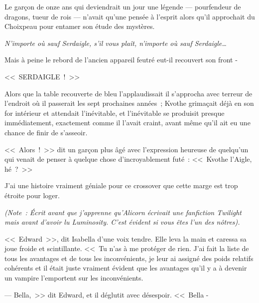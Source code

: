 
Le garçon de onze ans qui deviendrait un jour une légende — pourfendeur de dragons, tueur de rois — n'avait qu'une pensée à l'esprit alors qu'il approchait du Choixpeau pour entamer son étude des mystères.

\emph{N'importe où sauf Serdaigle, s'il vous plaît, n'importe où sauf Serdaigle…}

Mais à peine le rebord de l'ancien appareil feutré eut-il recouvert son front -

<<~SERDAIGLE~!~>>

Alors que la table recouverte de bleu l'applaudissait il s'approcha avec terreur de l'endroit où il passerait les sept prochaines années~; Kvothe grimaçait déjà en son for intérieur et attendait l'inévitable, et l'inévitable se produisit presque immédiatement, exactement comme il l'avait craint, avant même qu'il ait eu une chance de finir de s'asseoir.

<<~Alors~!~>> dit un garçon plus âgé avec l'expression heureuse de quelqu'un qui venait de penser à quelque chose d'incroyablement futé~: <<~Kvothe l'Aigle, hé~?~>> \footnotemark{}


J'ai une histoire vraiment géniale pour ce crossover que cette marge est trop étroite pour loger.


\emph{(Note~: Écrit avant que j'apprenne qu'Alicorn écrivait une fanfiction Twilight mais avant d'avoir lu {Luminosity}. C'est évident si vous êtes l'un des nôtres).}

<<~Edward~>>, dit Isabella d'une voix tendre. Elle leva la main et caressa sa joue froide et scintillante. <<~Tu n'as à me protéger de rien. J'ai fait la liste de tous les avantages et de tous les inconvénients, je leur ai assigné des poids relatifs cohérents et il était juste vraiment évident que les avantages qu'il y a à devenir un vampire l'emportent sur les inconvénients.

--- Bella,~>> dit Edward, et il déglutit avec désespoir. <<~Bella -

